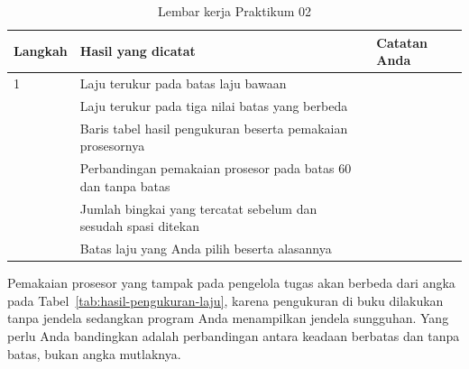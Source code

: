 \begin{table}[htbp]
\centering
\caption{Lembar kerja Praktikum 02}
\label{tab:lembar-praktikum-02}
{\setlength{\tabcolsep}{4pt}\footnotesize%
\begin{tabularx}{\textwidth}{@{}C{1.6cm} L{5.0cm} Y@{}}
\toprule
\headrow \textbf{Langkah} & \textbf{Hasil yang dicatat} & \textbf{Catatan Anda} \\
 & Laju terukur pada batas laju bawaan & \\[1.2em]
 & Laju terukur pada tiga nilai batas yang berbeda & \\[2.4em]
 & Baris tabel hasil pengukuran beserta pemakaian prosesornya & \\[2.4em]
 & Perbandingan pemakaian prosesor pada batas 60 dan tanpa batas & \\[2.4em]
 & Jumlah bingkai yang tercatat sebelum dan sesudah spasi ditekan & \\[1.2em]
 & Batas laju yang Anda pilih beserta alasannya & \\[2.0em]
\bottomrule
\end{tabularx}}
\end{table}

\begin{catatabox}
Pemakaian prosesor yang tampak pada pengelola tugas akan berbeda dari angka
pada Tabel~\ref{tab:hasil-pengukuran-laju}, karena pengukuran di buku
dilakukan tanpa jendela sedangkan program Anda menampilkan jendela
sungguhan. Yang perlu Anda bandingkan adalah perbandingan antara keadaan
berbatas dan tanpa batas, bukan angka mutlaknya.
\end{catatabox}
